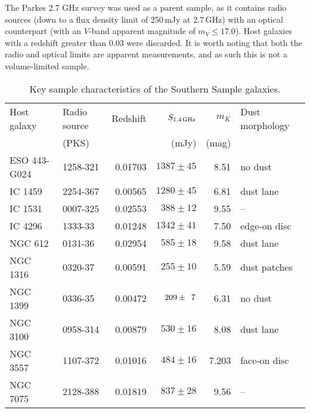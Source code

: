 \documentclass[fleqn,usenatbib,useAMS]{mnras}
\begin{document}

	The Parkes 2.7 GHz survey \citep{Ekers1989} was used as a parent sample, as it contains radio sources (down to a flux density limit of 250\,mJy at 2.7\,GHz) with an optical counterpart (with an $V$-band apparent magnitude of $m_V \le 17.0$). Host galaxies with a redshift greater than 0.03 were discarded. %
	It is worth noting that both the radio and optical limits are apparent measurements, and as such this is not a volume-limited sample.

	\begin{table*}
		\centering
	\begin{threeparttable}
		\caption{Key sample characteristics of the Southern Sample galaxies.}
		\label{tab:sample}
		\begin{tabular}{l l r r r l}
			\hline
			\hline
			Host galaxy	& Radio source 	& Redshift	& $S_\text{1.4\,GHz}$	& $m_K$ & Dust morphology\\
						& (PKS) 		& 			& (mJy) 			& (mag)	&\\
			\hline 
			ESO 443-G024 & 1258-321 	& 0.01703	& $1387 \pm 45$		& 8.51 & no dust\tnote{a}	\\ 
			IC 1459 	& 2254-367 		& 0.00565 	& $1280 \pm 45$		& 6.81 & dust lane\tnote{b}	\\
			IC 1531 	& 0007-325 		& 0.02553 	& $388 \pm 12$		& 9.55 & --					\\
			IC 4296		& 1333-\leavevmode\phantom{0}33 		& 0.01248 	& $1342 \pm 41$		& 7.50 & edge-on disc\tnote{b} \\
			NGC 612 	& 0131-\leavevmode\phantom{0}36 		& 0.02954 	& $585 \pm 18$		& 9.58 & dust lane\tnote{c}	\\
			NGC 1316 	& 0320-\leavevmode\phantom{0}37 & 0.00591 	& $255 \pm 10$		& 5.59 & dust patches\tnote{b} \\
			NGC 1399 	& 0336-\leavevmode\phantom{0}35 & 0.00472 	& $209 \pm \leavevmode\phantom{0}7$	& 6.31 & no dust\tnote{b}	\\
			NGC 3100 	& 0958-314 		& 0.00879 	& $530 \pm 16$		& 8.08 & dust lane\tnote{d}	\\
			NGC 3557 	& 1107-372 		& 0.01016 	& $484 \pm 16$		& 7.203 & face-on disc\tnote{b}\\
			NGC 7075 	& 2128-388 		& 0.01819 	& $837 \pm 28$		& 9.56 & --					\\

\end{tabular}
\end{threeparttable}
\end{table*}
\end{document}
